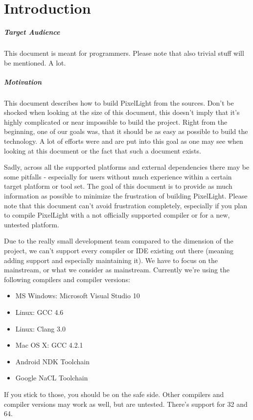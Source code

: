 \chapter{Introduction}


\paragraph{Target Audience}
This document is meant for programmers. Please note that also trivial stuff will be mentioned. A lot.


\paragraph{Motivation}
This document describes how to build PixelLight from the sources. Don't be shocked when looking at the size of this document, this doesn't imply that it's highly complicated or near impossible to build the project. Right from the beginning, one of our goals was, that it should be as easy as possible to build the technology. A lot of efforts were and are put into this goal as one may see when looking at this document or the fact that such a document exists.

Sadly, across all the supported platforms and external dependencies there may be some pitfalls - especially for users without much experience within a certain target platform or tool set. The goal of this document is to provide as much information as possible to minimize the frustration of building PixelLight. Please note that this document can't avoid frustration completely, especially if you plan to compile PixelLight with a not officially supported compiler or for a new, untested platform.

Due to the really small development team compared to the dimension of the project, we can't support every compiler or \ac{IDE} existing out there (meaning adding support and especially maintaining it). We have to focus on the mainstream, or what we consider as mainstream. Currently we're using the following compilers and compiler versions:
\begin{itemize}
\item{\ac{MS} Windows: Microsoft Visual Studio 10}
\item{Linux: \ac{GCC} 4.6}
\item{Linux: Clang 3.0}
\item{Mac OS X: \ac{GCC} 4.2.1}
\item{Android \ac{NDK} Toolchain}
\item{Google \ac{NaCL} Toolchain}
\end{itemize}
If you stick to those, you should be on the safe side. Other compilers and compiler versions may work as well, but are untested. There's support for \SI{32}{\bit} and \SI{64}{\bit}.

